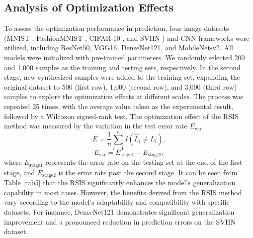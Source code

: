 \documentclass[lettersize,journal]{IEEEtran}
\begin{document}
\subsection{Analysis of Optimization Effects}
To assess the optimization performance in prediction, four 
image datasets (MNIST \cite{bib88}, FashionMNIST \cite{bib89}, CIFAR-10 \cite{bib90}, and 
SVHN \cite{bib91}) and CNN frameworks were utilized, including ResNet50, 
VGG16, DenseNet121, and MobileNet-v2. All models were initialized 
with pre-trained parameters. We randomly selected 200 and 1,000 
samples as the training and testing sets, respectively. In the 
second stage, new synthesized samples were added to the training 
set, expanding the original dataset to 500 (first row), 1,000 (second row), and 3,000 (third row) 
samples to explore the optimization effects at different scales. 
The process was repeated 25 times, with the average value taken 
as the experimental result, followed by a Wilcoxon signed-rank 
test. The optimization effect of the RSIS method was measured by 
the variation in the test error rate $E_{\text{var}}$:
\begin{equation}
\label{eq19}
  E=\dfrac{1}{n}\sum\limits_{i=1}^n{I}(\hat{L}_i\neq L_i),
\end{equation}
\begin{equation}
\label{eq20}
  E_{\text{var}}=E_{\text{stage1}}-E_{\text{stage2}},
\end{equation}
where $E_{\text{stage1}}$ represents the error rate on the testing 
set at the end of the first stage, and $E_{\text{stage2}}$ is 
the error rate post the second stage. It can be seen from Table \ref{tab5} 
that the RSIS significantly enhances the model's generalization 
capability in most cases. However, the benefits derived from the 
RSIS method vary according to the model's adaptability and 
compatibility with specific datasets. For instance, DenseNet121 
demonstrates significant generalization improvement and a 
pronounced reduction in prediction errors on the SVHN dataset.
\end{document}

